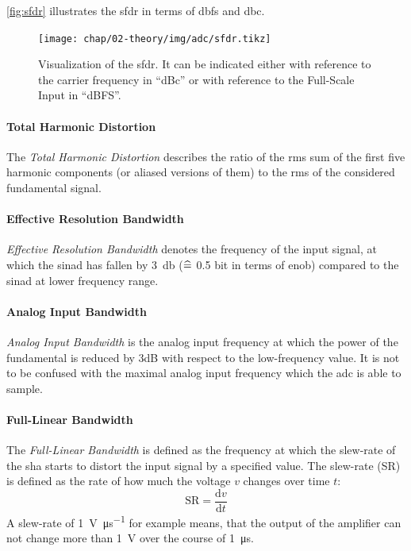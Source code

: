 \autoref{fig:sfdr} illustrates the \gls{sfdr} in terms of \gls{dbfs} and \gls{dbc}.

\begin{figure}[tb]
	\centering
	\texttt{[image: chap/02-theory/img/adc/sfdr.tikz]}
	\caption[SFDR definition]{Visualization of the \gls{sfdr}. It can be indicated either with reference to the carrier frequency in ``dBc'' or with reference to the Full-Scale Input in ``dBFS''. \cite{walt2009}}
	\label{fig:sfdr}
\end{figure}
\paragraph{Total Harmonic Distortion}
The \textit{Total Harmonic Distortion} describes the ratio of the \gls{rms} sum of the first five harmonic components (or aliased versions of them) to the \gls{rms} of the considered fundamental signal. \cite{Lundberg}

\paragraph{Effective Resolution Bandwidth}
\textit{Effective Resolution Bandwidth} denotes the frequency of the input signal, at which the \gls{sinad} has fallen by \SI{3}{\decibel} ($\mathrel{\widehat{=}}$ 0.5 bit in terms of \gls{enob}) compared to the \gls{sinad} at lower frequency range. \cite{Lundberg}

\paragraph{Analog Input Bandwidth}
\textit{Analog Input Bandwidth} is the analog input frequency at which the power of the fundamental is reduced by 3dB with respect to the low-frequency value. \cite{Lundberg}
It is not to be confused with the maximal analog input frequency which the \gls{adc} is able to sample.

\paragraph{Full-Linear Bandwidth}
The \textit{Full-Linear Bandwidth} is defined as the frequency at which the slew-rate of the \gls{sha} starts to distort the input signal by a specified value. \cite{Lundberg} 
The slew-rate (SR) is defined as the rate of how much the voltage $v$ changes over time $t$:
\begin{equation}
	\text{SR} = \frac{\text{d}v}{\text{d}t}
\end{equation}
A slew-rate of \SI{1}{\volt \per \micro \second} for example means, that the output of the amplifier can not change more than \SI{1}{\volt} over the course of \SI{1}{\micro \second}.\cite{2021Slew} 


